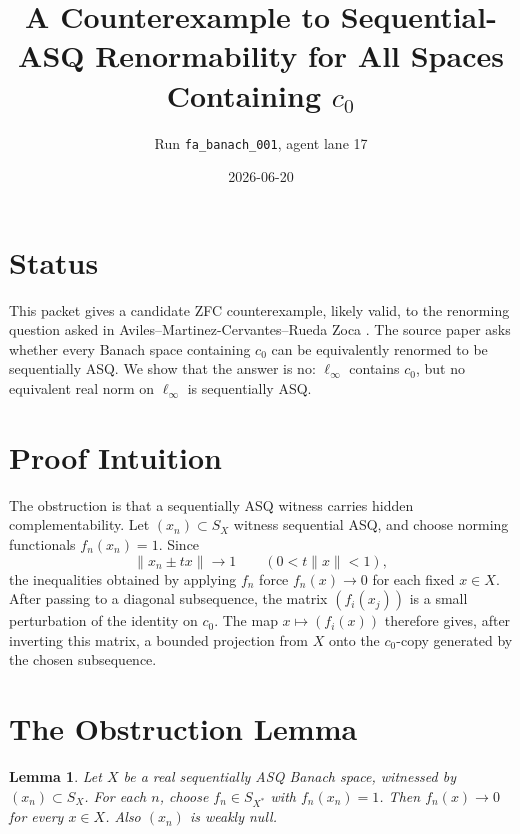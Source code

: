 \documentclass[11pt]{article}
\title{A Counterexample to Sequential-ASQ Renormability for All Spaces Containing \(c_0\)}
\author{Run \texttt{fa\_banach\_001}, agent lane 17}
\date{2026-06-20}
\newtheorem{lemma}{Lemma}
\begin{document}
\maketitle

\section*{Status}

This packet gives a candidate ZFC counterexample, likely valid, to the
renorming question asked in Aviles--Martinez-Cervantes--Rueda Zoca
\cite[p.~2]{AMRZ}.  The source paper asks whether every Banach space containing
\(c_0\) can be equivalently renormed to be sequentially ASQ.  We show that the
answer is no: \(\ell_\infty\) contains \(c_0\), but no equivalent real norm on
\(\ell_\infty\) is sequentially ASQ.

\section*{Proof Intuition}

The obstruction is that a sequentially ASQ witness carries hidden
complementability.  Let \((x_n)\subset S_X\) witness sequential ASQ, and choose
norming functionals \(f_n(x_n)=1\).  Since
\[
        \|x_n\pm t x\|\longrightarrow 1
        \qquad (0<t\|x\|<1),
\]
the inequalities obtained by applying \(f_n\) force \(f_n(x)\to 0\) for each
fixed \(x\in X\).  After passing to a diagonal subsequence, the matrix
\((f_i(x_j))\) is a small perturbation of the identity on \(c_0\).  The map
\(x\mapsto (f_i(x))\) therefore gives, after inverting this matrix, a bounded
projection from \(X\) onto the \(c_0\)-copy generated by the chosen subsequence.

\section*{The Obstruction Lemma}

\begin{lemma}\label{lem:pointwise}
Let \(X\) be a real sequentially ASQ Banach space, witnessed by
\((x_n)\subset S_X\).  For each \(n\), choose \(f_n\in S_{X^*}\) with
\(f_n(x_n)=1\).  Then \(f_n(x)\to 0\) for every \(x\in X\).  Also
\((x_n)\) is weakly null.
\end{lemma}
\end{document}
